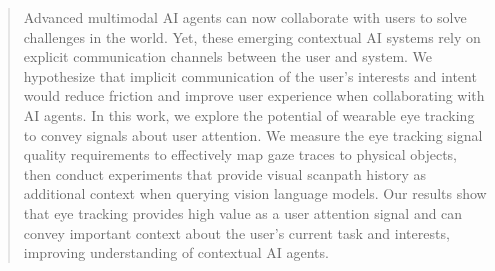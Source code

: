 \begin{abstract}


Advanced multimodal AI agents can now collaborate with users to solve challenges in the world.  Yet, these emerging contextual AI systems rely on explicit communication channels between the user and system.  We hypothesize that implicit communication of the user's interests and intent would reduce friction and improve user experience when collaborating with AI agents.  In this work, we explore the potential of wearable eye tracking to convey signals about user attention.  We measure the eye tracking signal quality requirements to effectively map gaze traces to physical objects, then conduct experiments that provide visual scanpath history as additional context when querying vision language models.  Our results show that eye tracking provides high value as a user attention signal and can convey important context about the user's current task and interests, improving understanding of contextual AI agents.

\end{abstract}